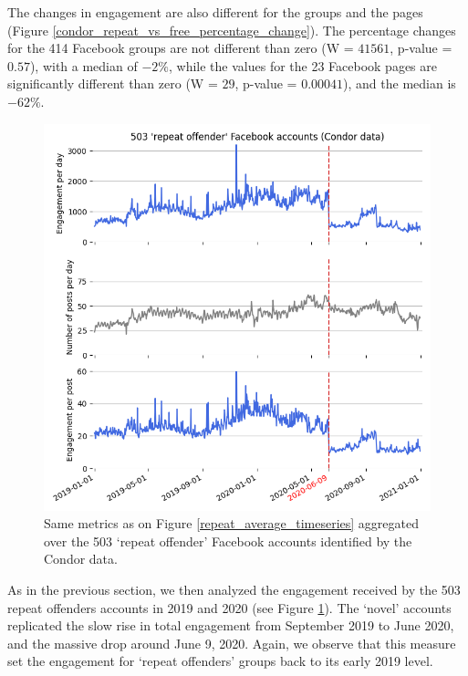 \documentclass[review]{elsarticle}
\begin{document}
The changes in engagement are also different for the groups and the pages (Figure \ref{condor_repeat_vs_free_percentage_change}). 
The percentage changes for the 414 Facebook groups are not different than zero (W = $41561$, p-value = $0.57$), with a median of $-2\%$, while the values for the 23 Facebook pages are significantly different than zero (W = $29$, p-value = $0.00041$), and the median is $-62\%$.

\begin{figure}[!h]
\centering
\includegraphics[scale=0.5]{./../figure/condor_average_timeseries.png}
\caption{
Same metrics as on Figure \ref{repeat_average_timeseries} aggregated over the 503 `repeat offender' Facebook accounts identified by the Condor data.
}
\label{condor_average_timeseries}
\end{figure}

As in the previous section, we then analyzed the engagement received by the 503 repeat offenders accounts in 2019 and 2020 (see Figure \ref{condor_average_timeseries}). 
The `novel' accounts replicated the slow rise in total engagement from September 2019 to June 2020, and the massive drop around June 9, 2020.
Again, we observe that this measure set the engagement for ‘repeat offenders’ groups back to its early 2019 level.
\end{document}
